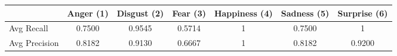 \begin{center}
    \begin{tabular}{ | l || c | c | c | c | c | c | }
    \hline
          & Anger (1) & Disgust (2) & Fear (3) & Happiness (4) & Sadness (5) & Surprise (6) \\ \hline \hline
        Avg Recall & 0.7500 & 0.9545 & 0.5714 & 1 & 0.7500 & 1 \\ \hline
        Avg Precision & 0.8182 & 0.9130 & 0.6667 & 1 & 0.8182 & 0.9200 \\ \hline
    \end{tabular}
\end{center}
